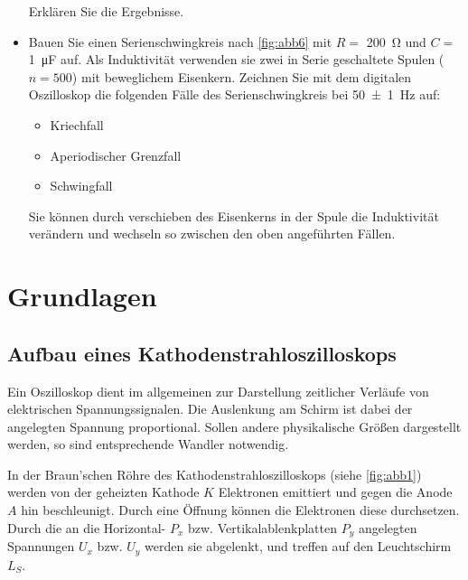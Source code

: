 \documentclass[11pt,ngerman]{scrartcl}
\begin{document}
\begin{itemize}
\begin{itemize}
	      \end{itemize}

	      Erklären Sie die Ergebnisse.

	\item Bauen Sie einen Serienschwingkreis nach \autoref{fig:abb6} mit $R = $ \SI{200}{\ohm} und $C = $ \SI{1}{\micro\farad} auf. Als Induktivität verwenden sie zwei in Serie geschaltete Spulen ($n=500$) mit beweglichem Eisenkern. Zeichnen Sie mit dem digitalen Oszilloskop die folgenden Fälle des Serienschwingkreis
	      bei \SI{50(1)}{\hertz} auf:

	      \begin{itemize}

		      \item Kriechfall

		      \item Aperiodischer Grenzfall

		      \item Schwingfall

	      \end{itemize}
	      Sie können durch verschieben des Eisenkerns in der Spule die Induktivität verändern und
	      wechseln so zwischen den oben angeführten Fällen.

\end{itemize}

\newpage

\section{Grundlagen}

\subsection{Aufbau eines Kathodenstrahloszilloskops}

Ein Oszilloskop dient im allgemeinen zur Darstellung zeitlicher Verläufe von elektrischen Spannungssignalen.
Die Auslenkung am Schirm ist dabei der angelegten Spannung proportional.
Sollen andere physikalische Größen dargestellt werden, so sind entsprechende Wandler notwendig.

In der Braun’schen Röhre des Kathodenstrahloszilloskops (siehe \autoref{fig:abb1}) werden von der geheizten
Kathode $K$ Elektronen emittiert und gegen die Anode $A$ hin beschleunigt. Durch eine Öffnung können die Elektronen diese durchsetzen. Durch die an die Horizontal- $P_x$ bzw. Vertikalablenkplatten $P_y$ angelegten Spannungen $U_x$ bzw. $U_y$ werden sie abgelenkt, und treffen auf den Leuchtschirm $L_S$.
\end{document}
